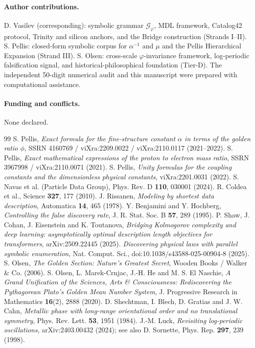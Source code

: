 \documentclass[11pt]{article}
\newcommand{\phigr}{\varphi}
\begin{document}
\paragraph{Author contributions.} D. Vasilev (corresponding): symbolic grammar $\mathcal{G}_{\phigr}$, MDL framework, Catalog42 protocol, Trinity and silicon anchors, and the Bridge construction (Strands I--II). S. Pellis: closed-form symbolic corpus for $\alpha^{-1}$ and $\mu$ and the Pellis Hierarchical Expansion (Strand III). S. Olsen: cross-scale $\phigr$-invariance framework, log-periodic falsification signal, and historical-philosophical foundation (Tier-D). The independent 50-digit numerical audit and this manuscript were prepared with computational assistance.

\paragraph{Funding and conflicts.} None declared.

\begin{thebibliography}{99}
 S. Pellis, \emph{Exact formula for the fine-structure constant $\alpha$ in terms of the golden ratio $\phi$}, SSRN 4160769 / viXra:2209.0022 / viXra:2110.0117 (2021--2022).
 S. Pellis, \emph{Exact mathematical expressions of the proton to electron mass ratio}, SSRN 3967998 / viXra:2110.0071 (2021).
 S. Pellis, \emph{Unity formulas for the coupling constants and the dimensionless physical constants}, viXra:2201.0031 (2022).
 S. Navas et al. (Particle Data Group), Phys. Rev. D \textbf{110}, 030001 (2024).
 R. Coldea et al., Science \textbf{327}, 177 (2010).
 J. Rissanen, \emph{Modeling by shortest data description}, Automatica \textbf{14}, 465 (1978).
 Y. Benjamini and Y. Hochberg, \emph{Controlling the false discovery rate}, J. R. Stat. Soc. B \textbf{57}, 289 (1995).
 P. Shaw, J. Cohan, J. Eisenstein and K. Toutanova, \emph{Bridging Kolmogorov complexity and deep learning: asymptotically optimal description length objectives for transformers}, arXiv:2509.22445 (2025).
 \emph{Discovering physical laws with parallel symbolic enumeration}, Nat. Comput. Sci., doi:10.1038/s43588-025-00904-8 (2025).
 S. Olsen, \emph{The Golden Section: Nature's Greatest Secret}, Wooden Books / Walker \& Co. (2006).
 S. Olsen, L. Marek-Crnjac, J.-H. He and M. S. El Naschie, \emph{A Grand Unification of the Sciences, Arts \& Consciousness: Rediscovering the Pythagorean Plato's Golden Mean Number System}, J. Progressive Research in Mathematics \textbf{16}(2), 2888 (2020).
 D. Shechtman, I. Blech, D. Gratias and J. W. Cahn, \emph{Metallic phase with long-range orientational order and no translational symmetry}, Phys. Rev. Lett. \textbf{53}, 1951 (1984).
 J.-M. Luck, \emph{Revisiting log-periodic oscillations}, arXiv:2403.00432 (2024); see also D. Sornette, Phys. Rep. \textbf{297}, 239 (1998).
\end{thebibliography}
\end{document}

